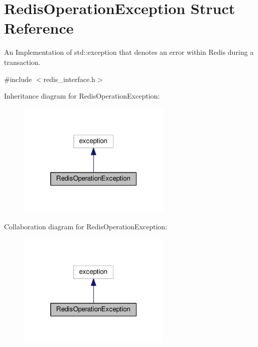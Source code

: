 \hypertarget{structRedisOperationException}{}\section{Redis\+Operation\+Exception Struct Reference}
\label{structRedisOperationException}


An Implementation of std\+::exception that denotes an error within Redis during a transaction.  




{\ttfamily \#include $<$redis\+\_\+interface.\+h$>$}



Inheritance diagram for Redis\+Operation\+Exception\+:
\nopagebreak
\begin{figure}[H]
\begin{center}
\leavevmode
\includegraphics[width=208pt]{structRedisOperationException__inherit__graph}
\end{center}
\end{figure}


Collaboration diagram for Redis\+Operation\+Exception\+:
\nopagebreak
\begin{figure}[H]
\begin{center}
\leavevmode
\includegraphics[width=208pt]{structRedisOperationException__coll__graph}
\end{center}
\end{figure}
